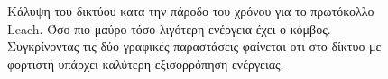 \begin{figure}[H]
  \centering
  \caption{Κάλυψη του δικτύου κατα την πάροδο του χρόνου για το πρωτόκολλο Leach. Όσο πιο μαύρο τόσο λιγότερη ενέργεια έχει ο κόμβος. Συγκρίνοντας τις δύο γραφικές
παραστάσεις φαίνεται οτι στο δίκτυο με φορτιστή υπάρχει καλύτερη εξισορρόπηση ενέργειας.}
  \label{fig:1exp_4_2}
\end{figure}

